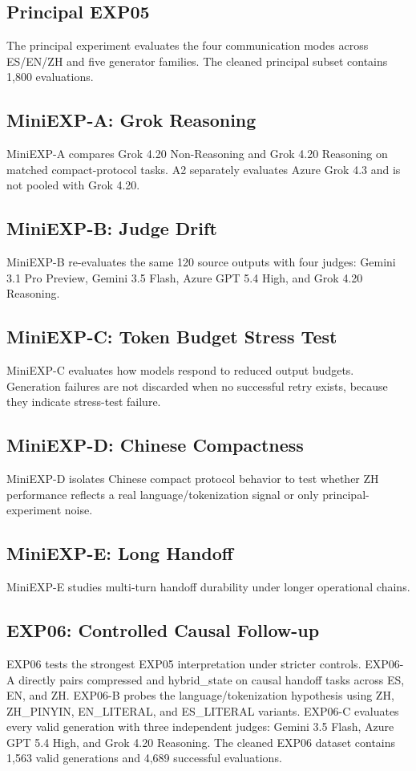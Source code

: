 \documentclass[11pt]{article}
\begin{document}
\subsection{Principal EXP05}
The principal experiment evaluates the four communication modes across ES/EN/ZH and five generator families. The cleaned principal subset contains 1,800 evaluations.

\subsection{MiniEXP-A: Grok Reasoning}
MiniEXP-A compares Grok 4.20 Non-Reasoning and Grok 4.20 Reasoning on matched compact-protocol tasks. A2 separately evaluates Azure Grok 4.3 and is not pooled with Grok 4.20.

\subsection{MiniEXP-B: Judge Drift}
MiniEXP-B re-evaluates the same 120 source outputs with four judges: Gemini 3.1 Pro Preview, Gemini 3.5 Flash, Azure GPT 5.4 High, and Grok 4.20 Reasoning.

\subsection{MiniEXP-C: Token Budget Stress Test}
MiniEXP-C evaluates how models respond to reduced output budgets. Generation failures are not discarded when no successful retry exists, because they indicate stress-test failure.

\subsection{MiniEXP-D: Chinese Compactness}
MiniEXP-D isolates Chinese compact protocol behavior to test whether ZH performance reflects a real language/tokenization signal or only principal-experiment noise.

\subsection{MiniEXP-E: Long Handoff}
MiniEXP-E studies multi-turn handoff durability under longer operational chains.

\subsection{EXP06: Controlled Causal Follow-up}
EXP06 tests the strongest EXP05 interpretation under stricter controls. EXP06-A directly pairs compressed and hybrid\_state on causal handoff tasks across ES, EN, and ZH. EXP06-B probes the language/tokenization hypothesis using ZH, ZH\_PINYIN, EN\_LITERAL, and ES\_LITERAL variants. EXP06-C evaluates every valid generation with three independent judges: Gemini 3.5 Flash, Azure GPT 5.4 High, and Grok 4.20 Reasoning. The cleaned EXP06 dataset contains 1,563 valid generations and 4,689 successful evaluations.
\end{document}
